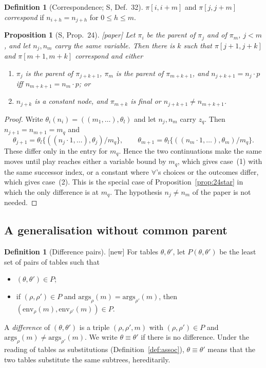 \documentclass[11pt]{article}
\newcommand{\suc}[2]{#1{\cdot}#2}
\newcommand{\iv}[2]{\pi[#1,#2]}
\newcommand{\args}{\mathrm{args}}
\newcommand{\env}{\mathrm{env}}
\newcommand{\Paper}{\textsf{[paper]}}
\newcommand{\New}{\textsf{[new]}}
\theoremstyle{plain}
\newtheorem{proposition}[theorem]{Proposition}
\theoremstyle{definition}
\newtheorem{definition}[theorem]{Definition}
\theoremstyle{remark}
\begin{document}
\begin{definition}[Correspondence; S, Def.~32]
$\iv i{i+m}$ and $\iv j{j+m}$ \emph{correspond} if $n_{i+h}=n_{j+h}$ for
$0\le h\le m$.
\end{definition}

\begin{proposition}[S, Prop.~24]\label{prop:24}
\Paper{} Let $\pi_i$ be the parent of $\pi_j$ and of $\pi_m$, $j<m$, and
let $n_j,n_m$ carry the same variable.  Then there is $k$ such that
$\iv{j+1}{j+k}$ and $\iv{m+1}{m+k}$ correspond and either
\begin{enumerate}
\item[(1)] $\pi_j$ is the parent of $\pi_{j+k+1}$, $\pi_m$ is the parent of
  $\pi_{m+k+1}$, and $n_{j+k+1}=\suc{n_j}p$ iff $n_{m+k+1}=\suc{n_m}p$; or
\item[(2)] $n_{j+k}$ is a constant node, and $\pi_{m+k}$ is final or
  $n_{j+k+1}\ne n_{m+k+1}$.
\end{enumerate}
\end{proposition}
\begin{proof}
Write $\theta_i(n_i)=((m_1,\dots),\theta_l)$ and let $n_j,n_m$ carry $z_q$.
Then $n_{j+1}=n_{m+1}=m_q$ and
\[
\theta_{j+1}=\theta_l\{((\suc{n_j}1,\dots),\theta_j)/m_q\},\qquad
\theta_{m+1}=\theta_l\{((\suc{n_m}1,\dots),\theta_m)/m_q\}.
\]
These differ only in the entry for $m_q$.  Hence the two continuations
make the same moves until play reaches either a variable bound by
$m_q$, which gives case~(1) with the same successor index, or a
constant where $\forall$'s choices or the outcomes differ, which gives
case~(2).  This is the special case of Proposition~\ref{prop:24star} in
which the only difference is at $m_q$.  The hypothesis $n_j\ne n_m$ of
the paper is not needed.
\end{proof}

\subsection{A generalisation without common parent}

\begin{definition}[Difference pairs]\label{def:diff}
\New{} For tables $\theta,\theta'$, let $P(\theta,\theta')$ be the least
set of pairs of tables such that
\begin{itemize}
\item $(\theta,\theta')\in P$;
\item if $(\rho,\rho')\in P$ and $\args_\rho(m)=\args_{\rho'}(m)$, then
  $(\env_\rho(m),\env_{\rho'}(m))\in P$.
\end{itemize}
A \emph{difference} of $(\theta,\theta')$ is a triple $(\rho,\rho',m)$ with
$(\rho,\rho')\in P$ and $\args_\rho(m)\ne\args_{\rho'}(m)$.  We write
$\theta\equiv\theta'$ if there is no difference.  Under the reading of
tables as substitutions (Definition~\ref{def:assoc}), $\theta\equiv\theta'$
means that the two tables substitute the same subtrees, hereditarily.
\end{definition}
\end{document}
